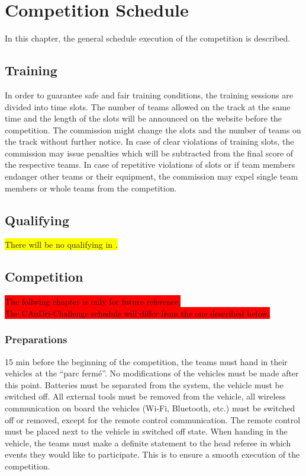 \chapter{Competition Schedule}

In this chapter, the general schedule execution of the competition is
described.

\section{Training}

In order to guarantee safe and fair training conditions, the training sessions
are divided into time slots. The number of teams allowed on the track at the
same time and the length of the slots will be announced on the website before
the competition. The commission might change the slots and the number of teams
on the track without further notice. In case of clear violations of training
slots, the commission may issue penalties which will be subtracted from the
final score of the respective teams. In case of repetitive violations of slots
or if team members endanger other teams or their equipment, the commission may
expel single team members or whole teams from the competition.

\section{Qualifying}

\colorbox{yellow}{There will be no qualifying in \the\year{}.}

\section{Competition}

\colorbox{red}{The follwing chapter is only for future reference.}\\
\colorbox{red}{The \the\year{} CAuDri-Challenge schedule will differ from the one described below.}

\subsection{Preparations}

15 min before the beginning of the competition, the teams must hand in their vehicles at the “parc fermé”. No modifications of the vehicles must be made after this point. Batteries must be separated from the system, the vehicle must be switched off. All external tools must be removed from the vehicle, all wireless communication on board the vehicles (Wi-Fi, Bluetooth, etc.) must be switched off or removed, except for the remote control communication. The remote control must be placed next to the vehicle in switched off state. When handing in the vehicle, the teams must make a definite statement to the head referee in which events they would like to participate. This is to ensure a smooth execution of the competition.

